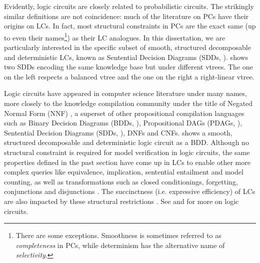 Evidently, logic circuits are closely related to probabilistic circuits. The strikingly similar
definitions are not coincidence: much of the literature on PCs have their origins on LCs. In fact,
most structural constraints in PCs are the exact same (up to even their names\footnote{There are
some exceptions. Smoothness is sometimes referred to as \emph{completeness} in PCs, while
determinism has the alternative name of \emph{selectivity}.}) as their LC analogues. In this
dissertation, we are particularly interested in the specific subset of smooth, structured
decomposable and deterministic LCs, known as Sentential Decision Diagrams (SDDs,
\cite{darwiche11}).  shows two SDDs encoding the same knowledge base but under
different vtrees. The one on the left respects a balanced vtree and the one on the right a
right-linear vtree.

Logic circuits have appeared in computer science literature under many names, more closely to the
knowledge compilation community under the title of Negated Normal Form (NNF)
\citep{darwiche01b,darwiche99}, a superset of other propositional compilation languages such as
Binary Decision Diagrams (BDDs, \cite{bryant86}), Propositional DAGs (PDAGs, \cite{wachter06}),
Sentential Decision Diagrams (SDDs, \cite{darwiche11}), DNFs and CNFs.  shows a
smooth, structured decomposable and deterministic logic circuit as a BDD. Although no structural
constraint is required for model verification in logic circuits, the same properties defined in the
past section have come up in LCs to enable other more complex queries like equivalence,
implication, sentential entailment and model counting, as well as transformations such as closed
conditionings, forgetting, conjunctions and disjunctions \citep{darwiche02}. The succinctness (i.e.
expressive efficiency) of LCs are also impacted by these structural restrictions
\citep{gogic95,papadimitriou94,darwiche02}.  See \citet{darwiche02} and \citet{darwiche20} for more
on logic circuits.

